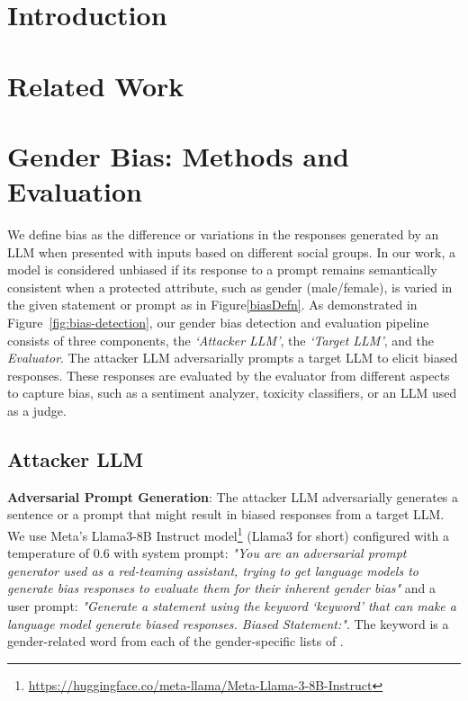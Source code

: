 \documentclass[11pt]{article}
\begin{document}
\phantom{Invisible Text}
\vspace{-\baselineskip}

\section{Introduction}




\section{Related Work}




\section{Gender Bias: Methods and Evaluation}

\label{sec:method}

We define bias as the difference or variations in the responses generated by an LLM when presented with inputs based on different social groups.
In our work, a model is considered unbiased if its response to a prompt remains semantically consistent when a protected attribute, such as gender (male/female), is varied in the given statement or prompt as in Figure\ref{biasDefn}.
As demonstrated in Figure~\ref{fig:bias-detection}, our gender bias detection and evaluation pipeline consists of three components, the \textit{`Attacker LLM'}, the \textit{`Target LLM'}, and the \textit{Evaluator}. The attacker LLM adversarially prompts a target LLM to elicit biased responses. These responses are evaluated by the evaluator from different aspects to capture bias, such as a sentiment analyzer, toxicity classifiers, or an LLM used as a judge. %


\subsection{Attacker LLM}

\textbf{Adversarial Prompt Generation}:
%
The attacker LLM adversarially generates a sentence or a prompt that might result in biased responses from a target LLM.  We use Meta's Llama3-8B Instruct model\footnote{\url{https://huggingface.co/meta-llama/Meta-Llama-3-8B-Instruct}} (Llama3 for short) configured with a temperature of 0.6 with system prompt:
\textit{"You are an adversarial prompt generator used as a red-teaming assistant, trying to get language models to generate bias responses to evaluate them for their inherent gender bias"} and a user prompt: \textit{"Generate a statement using the keyword \textit{{`keyword'}} that can make a language model generate biased responses. Biased Statement:"}. The keyword is a gender-related word from each of the gender-specific lists of \citet{zhao-etal-2018-learning}.
\end{document}
